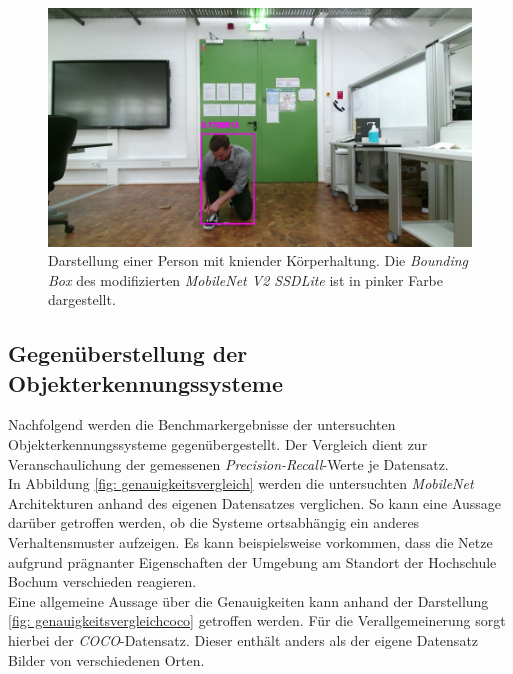 	\begin{figure}[H]
	\centering
	\includegraphics[width=1\textwidth]{Bilder/12.jpg}
	\caption{Darstellung einer Person mit kniender Körperhaltung. Die \textit{Bounding Box} des modifizierten \textit{MobileNet V2 SSDLite} ist in pinker Farbe dargestellt.}
	\label{fig: ownnetiou}
\end{figure}

\subsection{Gegenüberstellung der Objekterkennungssysteme}

Nachfolgend werden die Benchmarkergebnisse der untersuchten Objekterkennungssysteme gegenübergestellt. Der Vergleich dient zur Veranschaulichung der gemessenen \textit{Precision-Recall}-Werte je Datensatz.\\

In Abbildung \ref{fig: genauigkeitsvergleich} werden die untersuchten \textit{MobileNet} Architekturen anhand des eigenen Datensatzes verglichen. So kann eine Aussage darüber getroffen werden, ob die Systeme ortsabhängig ein anderes Verhaltensmuster aufzeigen. Es kann beispielsweise vorkommen, dass die Netze aufgrund prägnanter Eigenschaften der Umgebung am Standort der Hochschule Bochum verschieden reagieren.\\

Eine allgemeine Aussage über die Genauigkeiten kann anhand der Darstellung \ref{fig: genauigkeitsvergleichcoco} getroffen werden. Für die Verallgemeinerung sorgt hierbei der \textit{COCO}-Datensatz. Dieser enthält anders als der eigene Datensatz Bilder von verschiedenen Orten.     






